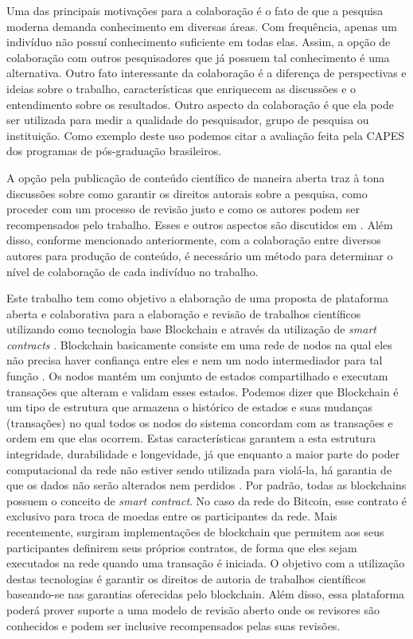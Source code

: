 Uma das principais motivações para a colaboração é o fato de que a pesquisa moderna demanda conhecimento em diversas áreas. Com frequência, apenas um indivíduo não possuí conhecimento suficiente em todas elas. Assim, a opção de colaboração com outros pesquisadores que já possuem tal conhecimento é uma alternativa. Outro fato interessante da colaboração é a diferença de perspectivas e ideias sobre o trabalho, características que enriquecem as discussões e o entendimento sobre os resultados. Outro aspecto da colaboração é que ela pode ser utilizada para medir a qualidade do pesquisador, grupo de pesquisa ou instituição. Como exemplo deste uso podemos citar a avaliação feita pela CAPES dos programas de pós-graduação brasileiros.

A opção pela publicação de conteúdo científico de maneira aberta traz à tona discussões sobre como garantir os direitos autorais sobre a pesquisa, como proceder com um processo de revisão justo e como os autores podem ser recompensados pelo trabalho. Esses e outros aspectos são discutidos em \cite{OpenAccessAnalysis2004}. Além disso, conforme mencionado anteriormente, com a colaboração entre diversos autores para produção de conteúdo, é necessário um método para determinar o nível de colaboração de cada indivíduo no trabalho.

Este trabalho tem como objetivo a elaboração de uma proposta de plataforma aberta e colaborativa para a elaboração e revisão de trabalhos científicos utilizando como tecnologia base Blockchain \cite{Bitcoin2008}e através da utilização de \textit{smart contracts} \cite{SmartContract2017}. Blockchain basicamente consiste em uma rede de nodos na qual eles não precisa haver confiança entre eles e nem um nodo intermediador para tal função \cite{UntanglingBlockchain2017}. Os nodos mantém um conjunto de estados compartilhado e executam transações que alteram e validam esses estados. Podemos dizer que Blockchain é um tipo de estrutura que armazena o histórico de estados e suas mudanças (transações) no qual todos os nodos do sistema concordam com as transações e ordem em que elas ocorrem. Estas características garantem a esta estrutura integridade, durabilidade e longevidade, já que enquanto a maior parte do poder computacional da rede não estiver sendo utilizada para violá-la, há garantia de que os dados não serão alterados nem perdidos \cite{Bitcoin2008}. Por padrão, todas as blockchains possuem o conceito de \textit{smart contract}. No caso da rede do Bitcoin, esse contrato é exclusivo para troca de moedas entre os participantes da rede. Mais recentemente, surgiram implementações de blockchain que permitem aos seus participantes definirem seus próprios contratos, de forma que eles sejam executados na rede quando uma transação é iniciada. O objetivo com a utilização destas tecnologias é garantir os direitos de autoria de trabalhos científicos baseando-se nas garantias oferecidas pelo blockchain. Além disso, essa plataforma poderá prover suporte a uma modelo de revisão aberto onde os revisores são conhecidos e podem ser inclusive recompensados pelas suas revisões.
